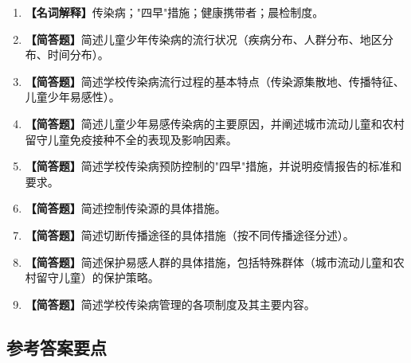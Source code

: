 \begin{enumerate}[leftmargin=*, itemsep=8pt]
    \item \textbf{【名词解释】}传染病；"四早"措施；健康携带者；晨检制度。
    \item \textbf{【简答题】}简述儿童少年传染病的流行状况（疾病分布、人群分布、地区分布、时间分布）。
    \item \textbf{【简答题】}简述学校传染病流行过程的基本特点（传染源集散地、传播特征、儿童少年易感性）。
    \item \textbf{【简答题】}简述儿童少年易感传染病的主要原因，并阐述城市流动儿童和农村留守儿童免疫接种不全的表现及影响因素。
    \item \textbf{【简答题】}简述学校传染病预防控制的"四早"措施，并说明疫情报告的标准和要求。
    \item \textbf{【简答题】}简述控制传染源的具体措施。
    \item \textbf{【简答题】}简述切断传播途径的具体措施（按不同传播途径分述）。
    \item \textbf{【简答题】}简述保护易感人群的具体措施，包括特殊群体（城市流动儿童和农村留守儿童）的保护策略。
    \item \textbf{【简答题】}简述学校传染病管理的各项制度及其主要内容。
\end{enumerate}

\subsection*{参考答案要点}

